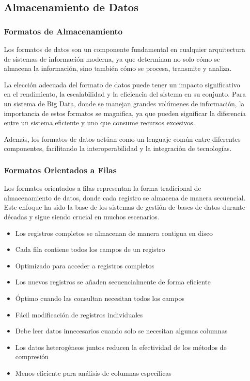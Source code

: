 \subsection{Almacenamiento de Datos}

\subsubsection {Formatos de Almacenamiento}

Los formatos de datos son un componente fundamental en cualquier arquitectura de sistemas de información moderna, 
ya que determinan no solo cómo se almacena la información, sino también cómo se procesa, transmite y analiza. \newline

La elección adecuada del formato de datos puede tener un impacto significativo en el rendimiento, 
la escalabilidad y la eficiencia del sistema en su conjunto. Para un sistema de Big Data, 
donde se manejan grandes volúmenes de información, la importancia de estos formatos se magnifica, 
ya que pueden significar la diferencia entre un sistema eficiente y uno que consume recursos excesivos. \newline

Además, los formatos de datos actúan como un lenguaje común entre diferentes componentes, 
facilitando la interoperabilidad y la integración de tecnologías.

\subsubsection{Formatos Orientados a Filas}
Los formatos orientados a filas representan la forma tradicional de almacenamiento de datos, 
donde cada registro se almacena de manera secuencial. Este enfoque ha sido la base de los sistemas 
de gestión de bases de datos durante décadas y sigue siendo crucial en muchos escenarios.

\begin{itemize}
    \item Los registros completos se almacenan de manera contigua en disco
    \item Cada fila contiene todos los campos de un registro
    \item Optimizado para acceder a registros completos
    \item Los nuevos registros se añaden secuencialmente de forma eficiente
    \item Óptimo cuando las consultan necesitan todos los campos
    \item Fácil modificación de registros individuales
    \item Debe leer datos innecesarios cuando solo se necesitan algunas columnas
    \item Los datos heterogéneos juntos reducen la efectividad de los métodos de compresión
    \item Menos eficiente para análisis de columnas específicas
\end{itemize}

